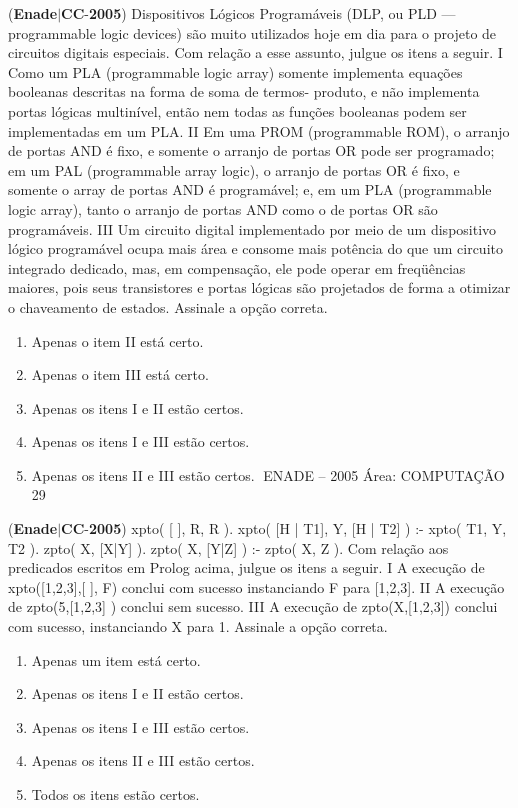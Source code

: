 \documentclass{exam}
\begin{document}
\begin{questions}
\question (\textbf{Enade}$|$\textbf{CC}-\textbf{2005}) Dispositivos Lógicos Programáveis (DLP, ou PLD — programmable
logic devices) são muito utilizados hoje em dia para o projeto de
circuitos digitais especiais. Com relação a esse assunto, julgue os
itens a seguir.
I Como um PLA (programmable logic array) somente implementa
equações booleanas descritas na forma de soma de termos-
produto, e não implementa portas lógicas multinível, então nem
todas as funções booleanas podem ser implementadas em um
PLA.
II Em uma PROM (programmable ROM), o arranjo de portas AND
é fixo, e somente o arranjo de portas OR pode ser programado; em
um PAL (programmable array logic), o arranjo de portas OR é
fixo, e somente o array de portas AND é programável; e, em um
PLA (programmable logic array), tanto o arranjo de portas AND
como o de portas OR são programáveis.
III Um circuito digital implementado por meio de um dispositivo
lógico programável ocupa mais área e consome mais potência do
que um circuito integrado dedicado, mas, em compensação, ele
pode operar em freqüências maiores, pois seus transistores e
portas lógicas são projetados de forma a otimizar o chaveamento
de estados.
Assinale a opção correta.
	\begin{enumerate}[label=\alph*)]
		\item  Apenas o item II está certo.
		\item  Apenas o item III está certo.
		\item  Apenas os itens I e II estão certos.
		\item  Apenas os itens I e III estão certos.
		\item  Apenas os itens II e III estão certos.
ENADE – 2005 Área: COMPUTAÇÃO 29

	\end{enumerate}

\question (\textbf{Enade}$|$\textbf{CC}-\textbf{2005}) xpto( [ ], R, R ).
xpto( [H | T1], Y, [H | T2] ) :- xpto( T1, Y, T2 ).
zpto( X, [X|Y] ).
zpto( X, [Y|Z] ) :- zpto( X, Z ).
Com relação aos predicados escritos em Prolog acima, julgue os
itens a seguir.
I A execução de xpto([1,2,3],[ ], F) conclui com sucesso
instanciando F para [1,2,3].
II A execução de zpto(5,[1,2,3] ) conclui sem sucesso.
III A execução de zpto(X,[1,2,3]) conclui com sucesso,
instanciando X para 1.
Assinale a opção correta.
	\begin{enumerate}[label=\alph*)]
		\item  Apenas um item está certo.
		\item  Apenas os itens I e II estão certos.
		\item  Apenas os itens I e III estão certos.
		\item  Apenas os itens II e III estão certos.
		\item  Todos os itens estão certos.


\end{enumerate}
\end{questions}
\end{document}
